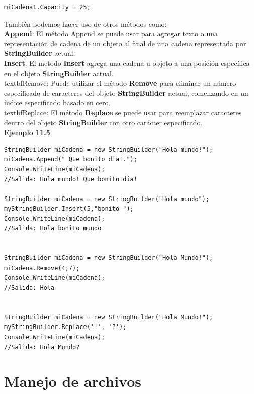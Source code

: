 \documentclass[12pt,a4paper]{report}
\begin{document}
\begin{lstlisting}
miCadena1.Capacity = 25;
\end{lstlisting}También podemos hacer uso de otros métodos como:\\\textbf{Append}: El método Append se puede usar para agregar texto o una representación de cadena de un objeto al final de una cadena representada por\textbf{ StringBuilder} actual.\\\textbf{Insert}: El método\textbf{ Insert} agrega una cadena u objeto a una posición específica en el objeto\textbf{ StringBuilder} actual.\\textbf{Remove}: Puede utilizar el método\textbf{ Remove} para eliminar un número especificado de caracteres del objeto\textbf{ StringBuilder} actual, comenzando en un índice especificado basado en cero.\\textbf{Replace}: El método \textbf{Replace} se puede usar para reemplazar caracteres dentro del objeto\textbf{ StringBuilder} con otro carácter especificado.\\\textbf{Ejemplo 11.5}
\begin{lstlisting}
StringBuilder miCadena = new StringBuilder("Hola mundo!");
miCadena.Append(" Que bonito dia!.");
Console.WriteLine(miCadena);
//Salida: Hola mundo! Que bonito dia!

StringBuilder miCadena = new StringBuilder("Hola mundo");
myStringBuilder.Insert(5,"bonito ");
Console.WriteLine(miCadena);
//Salida: Hola bonito mundo 


StringBuilder miCadena = new StringBuilder("Hola Mundo!");
miCadena.Remove(4,7);
Console.WriteLine(miCadena);
//Salida: Hola


StringBuilder miCadena = new StringBuilder("Hola Mundo!");
myStringBuilder.Replace('!', '?');
Console.WriteLine(miCadena);
//Salida: Hola Mundo?
\end{lstlisting}

\chapter{Manejo de archivos}
\end{document}
